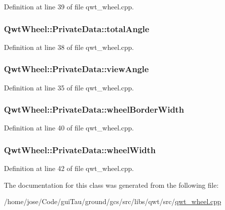 Definition at line 39 of file qwt\-\_\-wheel.\-cpp.

\hypertarget{class_qwt_wheel_1_1_private_data_a91e776794389220d7d8420f43b1e9b0c}{
\subsubsection[{total\-Angle}]{ Qwt\-Wheel\-::\-Private\-Data\-::total\-Angle}}\label{class_qwt_wheel_1_1_private_data_a91e776794389220d7d8420f43b1e9b0c}


Definition at line 38 of file qwt\-\_\-wheel.\-cpp.

\hypertarget{class_qwt_wheel_1_1_private_data_ae7b0c4f852b3a3c5f68d084f0d8d2b08}{
\subsubsection[{view\-Angle}]{ Qwt\-Wheel\-::\-Private\-Data\-::view\-Angle}}\label{class_qwt_wheel_1_1_private_data_ae7b0c4f852b3a3c5f68d084f0d8d2b08}


Definition at line 35 of file qwt\-\_\-wheel.\-cpp.

\hypertarget{class_qwt_wheel_1_1_private_data_a3d01d5cdc1b3fe90152e2822f8d3bc38}{
\subsubsection[{wheel\-Border\-Width}]{ Qwt\-Wheel\-::\-Private\-Data\-::wheel\-Border\-Width}}\label{class_qwt_wheel_1_1_private_data_a3d01d5cdc1b3fe90152e2822f8d3bc38}


Definition at line 40 of file qwt\-\_\-wheel.\-cpp.

\hypertarget{class_qwt_wheel_1_1_private_data_a55492bfbbc838c7200faa144bfecab21}{
\subsubsection[{wheel\-Width}]{ Qwt\-Wheel\-::\-Private\-Data\-::wheel\-Width}}\label{class_qwt_wheel_1_1_private_data_a55492bfbbc838c7200faa144bfecab21}


Definition at line 42 of file qwt\-\_\-wheel.\-cpp.



The documentation for this class was generated from the following file\-:\begin{DoxyCompactItemize}
\item 
/home/jose/\-Code/gui\-Tau/ground/gcs/src/libs/qwt/src/\hyperlink{qwt__wheel_8cpp}{qwt\-\_\-wheel.\-cpp}\end{DoxyCompactItemize}
